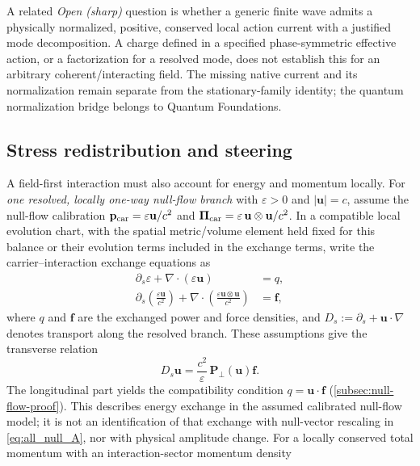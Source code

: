 \documentclass[11pt]{article}
\theoremstyle{definition}
\begin{document}
A related \emph{Open (sharp)} question is whether a generic finite wave admits a
physically normalized, positive, conserved local action current with a justified
mode decomposition.  A charge defined in a specified phase-symmetric effective
action, or a factorization for a resolved mode, does not establish this for an
arbitrary coherent/interacting field.  The missing native current and its
normalization remain separate from the stationary-family identity; the quantum
normalization bridge belongs to Quantum Foundations.

\subsection{Stress redistribution and steering}
\label{subsec:stress_steering}

A field-first interaction must also account for energy and momentum locally.  For
\emph{one resolved, locally one-way null-flow branch} with $\varepsilon>0$ and
$|\mathbf u|=c$, assume the null-flow calibration
$\mathbf p_{\rm car}=\varepsilon\mathbf u/c^2$ and
$\boldsymbol\Pi_{\rm car}=\varepsilon\,\mathbf u\otimes\mathbf u/c^2$.
In a compatible local evolution chart, with the spatial metric/volume element held
fixed for this balance or their evolution terms included in the exchange terms,
write the carrier--interaction exchange equations as
\begin{align}
\partial_s\varepsilon+\nabla\!\cdot(\varepsilon\mathbf u)&=q,
\label{eq:resolved_null_energy_balance}\\
\partial_s\!\left(\frac{\varepsilon\mathbf u}{c^2}\right)
+\nabla\!\cdot\!\left(\frac{\varepsilon\mathbf u\otimes\mathbf u}{c^2}\right)
&=\mathbf f,
\label{eq:resolved_null_momentum_balance}
\end{align}
where $q$ and $\mathbf f$ are the exchanged power and force densities, and
$D_s:=\partial_s+\mathbf u\!\cdot\nabla$ denotes transport along the resolved branch.
These assumptions give the transverse relation
\begin{equation}
\boxed{
 D_s\mathbf u=\frac{c^2}{\varepsilon}\,
 \mathbf P_\perp(\mathbf u)\mathbf f.}
\label{eq:force_balance}
\end{equation}
The longitudinal part yields the compatibility condition $q=\mathbf u\cdot\mathbf f$
(\cref{subsec:null-flow-proof}).  This describes energy exchange in the assumed
calibrated null-flow model; it is not an identification of that exchange with
null-vector rescaling in \cref{eq:all_null_A}, nor with physical amplitude change.
For a locally conserved total momentum with an interaction-sector momentum density
\end{document}
